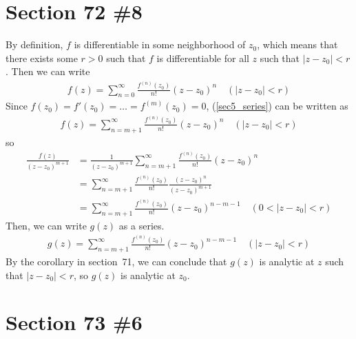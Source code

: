 \documentclass{scrartcl}
\begin{document}
\section{Section 72 \#8}
By definition, \(f\) is differentiable in some neighborhood of \(z_0\), which means that there exists some \(r > 0\) such that \(f\) is differentiable for all \(z\) such that \(|z - z_0| < r\).
Then we can write
\begin{align}\label{sec5_series}
  f(z)
  = \sum^\infty_{n = 0} \frac{f^{(n)}(z_0)}{n!}(z - z_0)^n \quad (|z - z_0| < r)
\end{align}
Since \(f(z_0) = f'(z_0) = \dots = f^{(m)}(z_0) = 0\), (\ref{sec5_series}) can be written as
\begin{align*}
  f(z)
  = \sum^\infty_{n = m + 1} \frac{f^{(n)}(z_0)}{n!}(z - z_0)^n \quad (|z - z_0| < r)
\end{align*}
so
\begin{align*}
  \frac{f(z)}{(z - z_0)^{m + 1}}
  &= \frac{1}{(z - z_0)^{m + 1}} \sum^\infty_{n = m + 1} \frac{f^{(n)}(z_0)}{n!}(z - z_0)^n \\
  &= \sum^\infty_{n = m + 1} \frac{f^{(n)}(z_0)}{n!}\frac{(z - z_0)^n}{(z - z_0)^{m + 1}} \\
  &= \sum^\infty_{n = m + 1} \frac{f^{(n)}(z_0)}{n!}(z - z_0)^{n - m - 1} \quad (0 < |z - z_0| < r)
\end{align*}
Then, we can write \(g(z)\) as a series.
\begin{align}\label{sec5_g_series}
  g(z)
  = \sum^\infty_{n = m + 1} \frac{f^{(n)}(z_0)}{n!} (z - z_0)^{n - m - 1} \quad (|z - z_0| < r)
\end{align}
By the corollary in section~71, we can conclude that \(g(z)\) is analytic at \(z\) such that \(|z - z_0| < r\), so \(g(z)\) is analytic at \(z_0\).

\section{Section 73 \#6}
\end{document}
